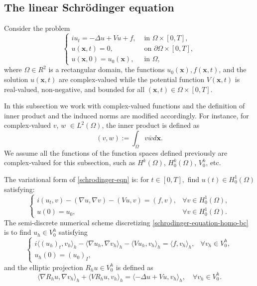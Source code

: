 \documentclass[onefignum,onetabnum]{siamart171218}
\begin{document}
\subsection{The linear Schr\"{o}dinger equation}\label{error-schrodinger}
Consider  the  problem 
\begin{equation}\label{schrodinger-eqn}
 \left\{\begin{array}{ll}
i u_{t}=-\Delta u+V u+f, & \textrm{ in } \Omega \times[0, T], \\
u(\mathbf x, t)=0, & \textrm{ on } \partial \Omega \times[0, T], \\
u(\mathbf x, 0)=u_{0}(\mathbf x), &  \textrm{ in } \Omega,
\end{array}\right.
\end{equation}
where $\Omega \in R^{2}$ is a rectangular domain, the functions $u_{0}(\mathbf x), f(\mathbf x, t)$, and the solution $u(\mathbf x, t)$ are complex-valued  while  the potential function $V(\mathbf x,t)$ is real-valued,  non-negative, and  bounded for all $(\mathbf x,t) \in \Omega \times[0, T]$.  

 In this subsection we work with complex-valued functions and  the definition of inner product and the induced norms are modified accordingly. For instance,  for complex-valued $v$, $w$ $\in L^2(\Omega)$, the inner product is defined as
$$
(v, w) :=  \int_{\Omega} v\bar{w} d\mathbf x.
$$
We assume all the functions of the function spaces defined previously are complex-valued for this subsection, such as $H^k(\Omega)$, $H_0^k(\Omega)$, $V^h_0$, etc.

The   variational form of \eqref{schrodinger-eqn} is: for $t \in[0, T],$ find $u(t) \in H_{0}^{1}(\Omega)$ satisfying:
\begin{equation}\label{schrodinger-equation-homo-bc}
\left\{\begin{array}{ll}
i \left(u_{t}, v\right) - (\nabla u, \nabla v) - (Vu,  v)  = (f, v), & \forall v \in H_{0}^{1}(\Omega), \\
u(0)=u_{0},  & \forall v \in H_{0}^{1}(\Omega).
\end{array}\right.
\end{equation}
The semi-discrete numerical scheme discretizing  \eqref{schrodinger-equation-homo-bc} is to find $u_h \in V^h_0$ satisfying
\begin{equation}\label{schrodinger-scheme}
\left\{\begin{array}{ll}
i\langle (u_h)_{t}, v_h \rangle_h - \langle \nabla u_h, \nabla v_h\rangle_h - \langle Vu_h,  v_h\rangle_h  = \langle f, v_h\rangle_h, & \forall v_h \in V^h_0, \\
u_h(0)=(u_{0})_I,
\end{array}\right.
\end{equation}
and the elliptic projection $ R_hu\in V_0^h$ is defined as 
\begin{equation}
\langle \nabla R_hu, \nabla v_h \rangle_h + \langle V R_hu,  v_h \rangle_h = \langle -\Delta u + Vu,  v_h \rangle_h, \quad \forall v_h \in V^h_0.
\end{equation}
 
\end{document}
